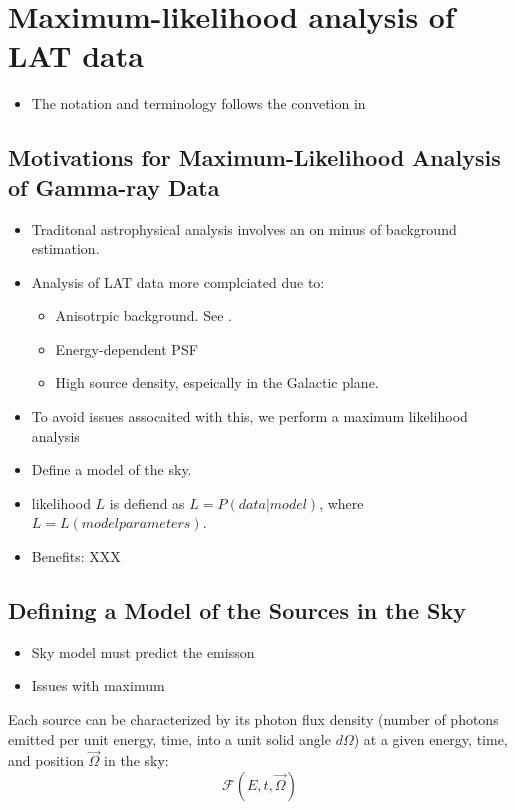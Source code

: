\chapter{Maximum-likelihood analysis of LAT data}


\begin{itemize}
  \item The notation and terminology follows the convetion in 
\end{itemize}

\section{Motivations for Maximum-Likelihood Analysis of Gamma-ray Data}

\begin{itemize}
  \item Traditonal astrophysical analysis involves an on minus of background estimation.
  \item Analysis of LAT data more complciated due to:
    \begin{itemize}
      \item Anisotrpic background. See .
      \item Energy-dependent PSF
      \item High source density, espeically in the Galactic plane.
    \end{itemize}
  \item To avoid issues assocaited with this, we perform a maximum likelihood analysis
  \item Define a model of the sky.
  \item likelihood $L$ is defiend as $L=P(data|model)$, where $L=L(model parameters)$.
  \item Benefits: XXX
\end{itemize}

\section{Defining a Model of the Sources in the Sky}

\begin{itemize}
  \item Sky model must predict the emisson 
  \item Issues with maximum 
\end{itemize}

Each source can be characterized by its photon flux density (number
of photons emitted per unit energy, time, into a unit solid angle $d\Omega$)
at a given energy, time, and position $\vec\Omega$ in the sky:
\begin{equation}
  \mathcal{F}(E,t,\vec\Omega)
\end{equation}

